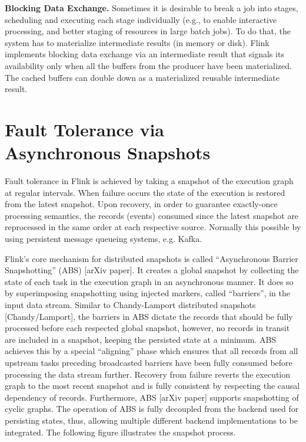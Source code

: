 \documentclass{sig-alternate}
\begin{document}
\textbf{Blocking Data Exchange.} Sometimes it is desirable to break a job into stages, scheduling and executing each stage individually (e.g., to enable interactive processing, and better staging of resources in large batch jobs). To do that, the system has to materialize intermediate results (in memory or disk). Flink implements blocking data exchange via an intermediate result that signals its availability only when all the buffers from the producer have been materialized. The cached buffers can double down as a materialized reusable intermediate result. 


\section{Fault Tolerance via \\ Asynchronous Snapshots}

Fault tolerance in Flink is achieved by taking a snapshot of the execution graph at regular intervals. When failure occurs the state of the execution is restored from the latest snapshot. Upon recovery, in order to guarantee exactly-once processing semantics, the records (events) consumed since the latest snapshot are reprocessed in the same order at each respective source. Normally this possible by using persistent message queueing systems, e.g. Kafka.

Flink's core mechanism for distributed snapshots is called ``Asynchronous Barrier Snapshotting'' (ABS) [arXiv paper]. It creates a global snapshot by collecting the state of each task in the execution graph in an asynchronous manner. It does so by superimposing snapshotting using injected markers, called ``barriers'', in the input data stream. Similar to Chandy-Lamport distributed snapshots [Chandy/Lamport], the barriers in ABS dictate the records that should be fully processed before each respected global snapshot, however, no records in transit are included in a snapshot, keeping the persisted state at a minimum. ABS achieves this by a special ``aligning'' phase which ensures that all records from all upstream tasks preceding broadcasted barriers have been fully consumed before processing the data stream further. Recovery from failure reverts the execution graph to the most recent snapshot and is fully consistent by respecting the causal dependency of records. Furthermore, ABS [arXiv paper] supports snapshotting of cyclic graphs.  The operation of ABS is fully decoupled from the backend used for persisting states, thus, allowing multiple different backend implementations to be integrated. The following figure illustrates the snapshot process.
\end{document}
